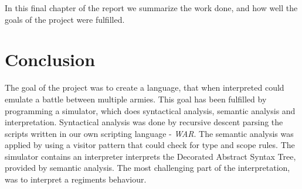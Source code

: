 In this final chapter of the report we summarize the work done, and how well the goals of the project were fulfilled.
\section{Conclusion}
	The goal of the project was to create a language, that when interpreted could emulate a battle between multiple armies. 
	This goal has been fulfilled by programming a simulator, which does syntactical analysis, semantic analysis and interpretation.
	Syntactical analysis was done by recursive descent parsing the scripts written in our own scripting language - \textit{WAR}. The semantic analysis was applied by using 
	a visitor pattern that could check for type and scope rules. The simulator contains an interpreter interprets the Decorated Abstract Syntax Tree, provided by semantic analysis.
	The most challenging part of the interpretation, was to interpret a regiments behaviour. \\
	
